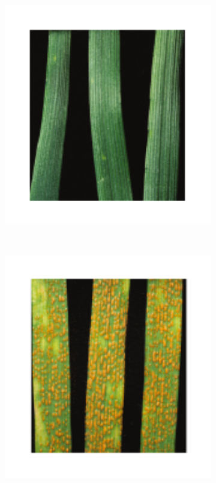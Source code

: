 \begin{figure}
    \centering
     \begin{subfigure}[b]{2.8cm}
        \includegraphics[width=1\textwidth]{Yr15/Figures/population/Yr15Photo.pdf}
        \caption{}
        \label{fig:yr15.yr15Photo}
    \end{subfigure}
    ~
    \begin{subfigure}[b]{2.8cm}
        \includegraphics[width=1\textwidth]{Yr15/Figures/population/AVSPhoto.pdf}
        \caption{}
        \label{fig:yr15:avsPhoto}
    \end{subfigure}


\end{figure}
